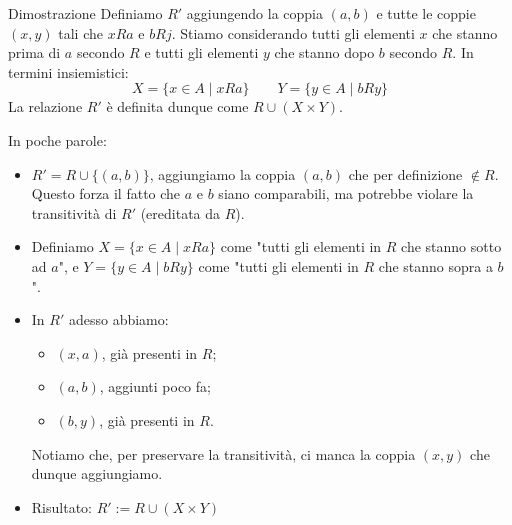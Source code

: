 \documentclass[12pt]{report}
\begin{document}
	\begin{dimostrazione}{Dimostrazione}{}
		Definiamo $R'$ aggiungendo la coppia $(a, b)$ e tutte le coppie $(x, y)$ tali che $xRa$ e $bRj$.
		Stiamo considerando tutti gli elementi $x$ che stanno prima di $a$ secondo $R$ e tutti gli elementi $y$ che stanno dopo $b$ secondo $R$. In termini insiemistici:
		\[
		X = \{x \in A \mid xRa\} \qquad Y = \{y \in A \mid bRy\}
		\]
		La relazione $R'$ è definita dunque come $R \cup (X \times Y)$.
	\end{dimostrazione}
	
	In poche parole:
	\begin{itemize}
		\item $R' = R \cup \{(a, b)\}$, aggiungiamo la coppia $(a, b)$ che per definizione $\notin R$. Questo forza il fatto che $a$ e $b$ siano comparabili, ma potrebbe violare la transitività di $R'$ (ereditata da $R$).
		\item Definiamo $X = \{x \in A \mid xRa\}$ come "tutti gli elementi in $R$ che stanno sotto ad $a$", e $Y = \{y \in A \mid bRy\}$ come "tutti gli elementi in $R$ che stanno sopra a $b$".
		\item In $R'$ adesso abbiamo:
		\begin{itemize}
			\item $(x, a)$, già presenti in $R$;
			\item $(a, b)$, aggiunti poco fa;
			\item $(b, y)$, già presenti in $R$.
		\end{itemize}
		Notiamo che, per preservare la transitività, ci manca la coppia $(x, y)$ che dunque aggiungiamo.
		\item Risultato: $R' := R \cup (X \times Y)$
	\end{itemize}
	
\end{document}
